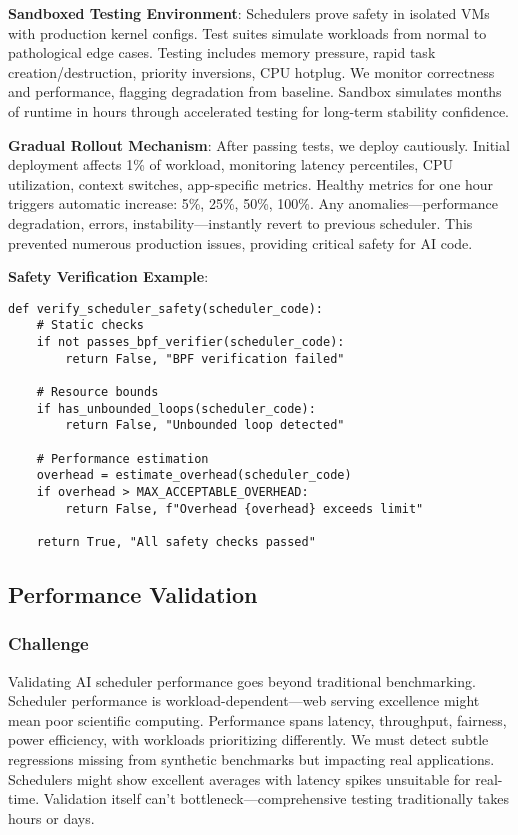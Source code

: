 \textbf{Sandboxed Testing Environment}: Schedulers prove safety in isolated VMs with production kernel configs. Test suites simulate workloads from normal to pathological edge cases. Testing includes memory pressure, rapid task creation/destruction, priority inversions, CPU hotplug. We monitor correctness and performance, flagging degradation from baseline. Sandbox simulates months of runtime in hours through accelerated testing for long-term stability confidence.

\textbf{Gradual Rollout Mechanism}: After passing tests, we deploy cautiously. Initial deployment affects 1\% of workload, monitoring latency percentiles, CPU utilization, context switches, app-specific metrics. Healthy metrics for one hour triggers automatic increase: 5\%, 25\%, 50\%, 100\%. Any anomalies—performance degradation, errors, instability—instantly revert to previous scheduler. This prevented numerous production issues, providing critical safety for AI code.

\textbf{Safety Verification Example}:
\begin{verbatim}
def verify_scheduler_safety(scheduler_code):
    # Static checks
    if not passes_bpf_verifier(scheduler_code):
        return False, "BPF verification failed"
    
    # Resource bounds
    if has_unbounded_loops(scheduler_code):
        return False, "Unbounded loop detected"
    
    # Performance estimation
    overhead = estimate_overhead(scheduler_code)
    if overhead > MAX_ACCEPTABLE_OVERHEAD:
        return False, f"Overhead {overhead} exceeds limit"
    
    return True, "All safety checks passed"
\end{verbatim}

\subsection{Performance Validation}

\subsubsection{Challenge}
Validating AI scheduler performance goes beyond traditional benchmarking. Scheduler performance is workload-dependent—web serving excellence might mean poor scientific computing. Performance spans latency, throughput, fairness, power efficiency, with workloads prioritizing differently. We must detect subtle regressions missing from synthetic benchmarks but impacting real applications. Schedulers might show excellent averages with latency spikes unsuitable for real-time. Validation itself can't bottleneck—comprehensive testing traditionally takes hours or days.

